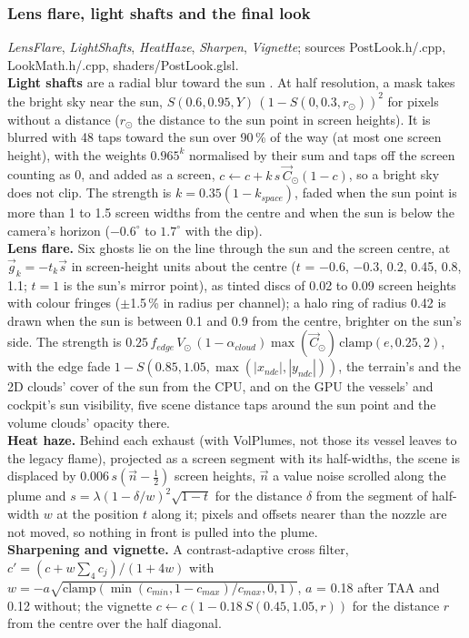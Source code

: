 \documentclass[Orbiter Technical Reference.tex]{subfiles}
\begin{document}
\begin{sloppypar}
\subsubsection{Lens flare, light shafts and the final look}
\textit{LensFlare}, \textit{LightShafts}, \textit{HeatHaze}, \textit{Sharpen}, \textit{Vignette}; sources PostLook.h/.cpp, LookMath.h/.cpp, shaders/PostLook.glsl.\\
\textbf{Light shafts} are a radial blur toward the sun \cite{mitchell2007}. At half resolution, a mask takes the bright sky near the sun, $S(0.6, 0.95, Y)\,(1 - S(0, 0.3, r_{\odot}))^{2}$ for pixels without a distance ($r_{\odot}$ the distance to the sun point in screen heights). It is blurred with 48 taps toward the sun over 90\,\% of the way (at most one screen height), with the weights $0.965^{k}$ normalised by their sum and taps off the screen counting as 0, and added as a screen, $c \leftarrow c + k\,s\,\vec{C}_{\odot}(1 - c)$, so a bright sky does not clip. The strength is $k = 0.35(1 - k_{space})$, faded when the sun point is more than 1 to 1.5 screen widths from the centre and when the sun is below the camera's horizon ($-0.6^{\circ}$ to $1.7^{\circ}$ with the dip).\\
\textbf{Lens flare.} Six ghosts lie on the line through the sun and the screen centre, at $\vec{g}_{k} = -t_{k}\vec{s}$ in screen-height units about the centre ($t$ = $-0.6$, $-0.3$, 0.2, 0.45, 0.8, 1.1; $t = 1$ is the sun's mirror point), as tinted discs of 0.02 to 0.09 screen heights with colour fringes ($\pm$1.5\,\% in radius per channel); a halo ring of radius 0.42 is drawn when the sun is between 0.1 and 0.9 from the centre, brighter on the sun's side. The strength is $0.25\,f_{edge}\,V_{\odot}\,(1 - \alpha_{cloud})\max(\vec{C}_{\odot})\,\mathrm{clamp}(e, 0.25, 2)$, with the edge fade $1 - S(0.85, 1.05, \max(|x_{ndc}|, |y_{ndc}|))$, the terrain's and the 2D clouds' cover of the sun from the CPU, and on the GPU the vessels' and cockpit's sun visibility, five scene distance taps around the sun point and the volume clouds' opacity there.\\
\textbf{Heat haze.} Behind each exhaust (with VolPlumes, not those its vessel leaves to the legacy flame), projected as a screen segment with its half-widths, the scene is displaced by $0.006\,s(\vec{n} - \frac{1}{2})$ screen heights, $\vec{n}$ a value noise scrolled along the plume and $s = \lambda(1 - \delta/w)^{2}\sqrt{1 - t}$ for the distance $\delta$ from the segment of half-width $w$ at the position $t$ along it; pixels and offsets nearer than the nozzle are not moved, so nothing in front is pulled into the plume.\\
\textbf{Sharpening and vignette.} A contrast-adaptive cross filter, $c' = (c + w\sum_{4} c_{j})/(1 + 4w)$ with $w = -a\sqrt{\mathrm{clamp}(\min(c_{min}, 1 - c_{max})/c_{max}, 0, 1)}$, $a$ = 0.18 after TAA and 0.12 without; the vignette $c \leftarrow c(1 - 0.18\,S(0.45, 1.05, r))$ for the distance $r$ from the centre over the half diagonal.


\end{sloppypar}
\end{document}
